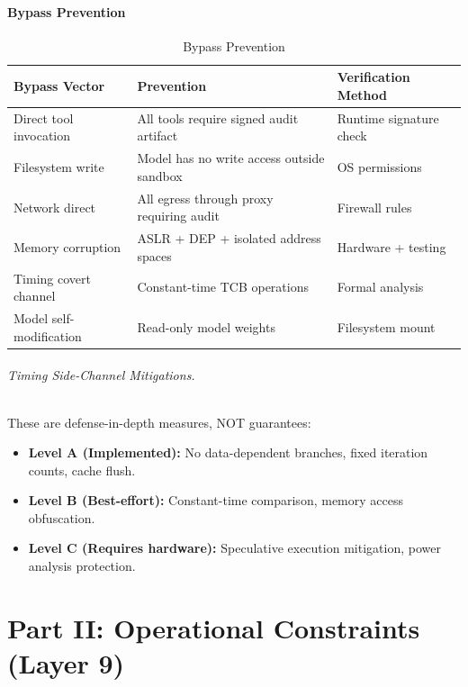 \documentclass[11pt,letterpaper]{article}
\theoremstyle{definition}
\theoremstyle{remark}
\begin{document}
\subsection{Bypass Prevention}

\begin{table}[h]
\centering
\small
\begin{tabular}{@{}lll@{}}
\toprule
\textbf{Bypass Vector} & \textbf{Prevention} & \textbf{Verification Method} \\
\midrule
Direct tool invocation & All tools require signed audit artifact & Runtime signature check \\
Filesystem write & Model has no write access outside sandbox & OS permissions \\
Network direct & All egress through proxy requiring audit & Firewall rules \\
Memory corruption & ASLR + DEP + isolated address spaces & Hardware + testing \\
Timing covert channel & Constant-time TCB operations & Formal analysis \\
Model self-modification & Read-only model weights & Filesystem mount \\
\bottomrule
\end{tabular}
\caption{Bypass Prevention}
\end{table}

\paragraph{Timing Side-Channel Mitigations.} These are defense-in-depth measures, NOT guarantees:
\begin{itemize}
\item \textbf{Level A (Implemented):} No data-dependent branches, fixed iteration counts, cache flush.
\item \textbf{Level B (Best-effort):} Constant-time comparison, memory access obfuscation.
\item \textbf{Level C (Requires hardware):} Speculative execution mitigation, power analysis protection.
\end{itemize}



\part*{Part II: Operational Constraints (Layer 9)}
\end{document}
